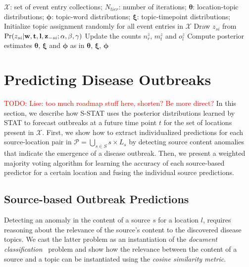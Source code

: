 \documentclass[conference]{IEEEtran}
\newcommand{\model}{{STAT}\xspace} %
\newcommand{\fullmodel}{{S-STAT}\xspace}
\newcommand{\w}{{\bf w}}
\newcommand{\z}{{\bf z}}
\newcommand{\loc}{{\bf l}}
\newcommand{\tim}{{\bf t}}
\newcommand{\todo}[1]{\textcolor{red}{{TODO: #1}}}
\begin{document}
\begin{algorithm}[h]
\caption{\model Gibbs Sampling Approximate Inference}
\begin{algorithmic}[1]
 $\mathcal{X}$: set of event entry collections; $N_{tier}$: number of iterations; 
 ${\boldsymbol \theta}$: location-topic distributions; ${\boldsymbol \phi}$: topic-word distributions; ${\boldsymbol \xi}$: topic-timepoint distributions;
\STATE Initialize topic assignment randomly for all event entries in $\mathcal{X}$
		\STATE Draw $z_{si}$ from $\Pr(z_{si}| \w,\tim,\loc,\z_{-si};\alpha,\beta,\gamma)$
		\STATE Update the counts $n^{z}_{r}$, $m^{z}_{t}$ and $o^z_l$
	\ENDFOR	
    \ENDFOR
\ENDFOR
\STATE Compute posterior estimates ${\boldsymbol \theta}$, ${\boldsymbol \xi}$ and ${\boldsymbol \phi}$ as in 
\RETURN ${\boldsymbol \theta}$, ${\boldsymbol \xi}$, ${\boldsymbol \phi}$
\end{algorithmic}
\label{algo:gibbs}
\end{algorithm}


\section{Predicting Disease Outbreaks}
\label{sec:pred}
\todo{Lise: too much roadmap stuff here, shorten? Be more direct?}
In this section, we describe how \fullmodel uses the posterior distributions learned by \model to forecast outbreaks at a future time point $t$ for the set of locations present in $\mathcal{X}$. 
First, we show how to extract individualized predictions for each source-location pair in $\mathcal{P} = \bigcup_{s \in S}s \times L_s$ by detecting source content anomalies that indicate the emergence of a disease outbreak. Then, we present a weighted majority voting algorithm for learning the accuracy of each source-based predictor for a certain location and fusing the individual source predictions.

\subsection{Source-based Outbreak Predictions}
\label{sec:source_pred}
Detecting an anomaly in the content of a source $s$ for a location $l$, requires reasoning about the relevance of the source's content to the discovered disease topics. We cast the latter problem as an instantiation of the {\em document classification}~\cite{strehl:2000} problem and show how the relevance between the content of a source and a topic can be instantiated using the {\em cosine similarity metric}.
\end{document}
